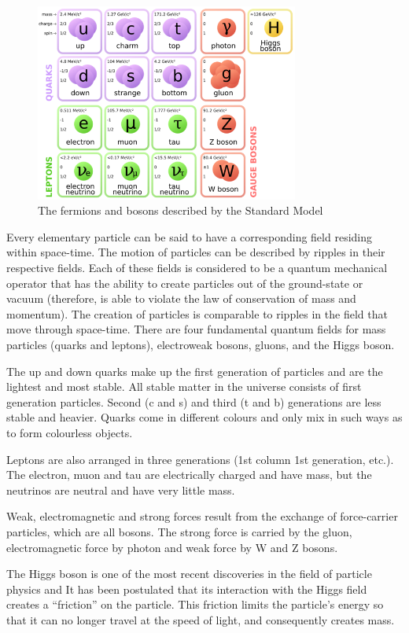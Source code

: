 \documentclass[runningheads,a4paper]{llncs}
\begin{document}
\begin{figure}
\centering
\includegraphics[height=6.5cm]{standardmodel}
\caption{The fermions and bosons described by the Standard Model}
\label{fig:standardmodel}
\end{figure}

Every elementary particle can be said to have a corresponding field residing within space-time. The motion of particles can be described by ripples in their respective fields. Each of these fields is considered to be a quantum mechanical operator that has the ability to create particles out of the ground-state or vacuum (therefore, is able to violate the law of conservation of mass and momentum). The creation of particles is comparable to ripples in the field that move through space-time. \cite{raby1997neutrino} There are four fundamental quantum fields for mass particles (quarks and leptons), electroweak bosons, gluons, and the Higgs boson.

The up and down quarks make up the first generation of particles and are the lightest and most stable. All stable matter in the universe consists of first generation particles. Second (c and s) and third (t and b) generations are less stable and heavier. Quarks come in different colours and only mix in such ways as to form colourless objects.

Leptons are also arranged in three generations (1st column 1st generation, etc.). The electron, muon and tau are electrically charged and have mass, but the neutrinos are neutral and have very little mass.

Weak, electromagnetic and strong forces result from the exchange of force-carrier particles, which are all bosons. The strong force is carried by the gluon, electromagnetic force by photon and weak force by W and Z bosons.

The Higgs boson is one of the most recent discoveries in the field of particle physics and It has been postulated that its interaction with the Higgs field creates a “friction” on the particle. This friction limits the particle’s energy so that it can no longer travel at the speed of light, and consequently creates mass. \cite{melnikov2010w+}
\end{document}
